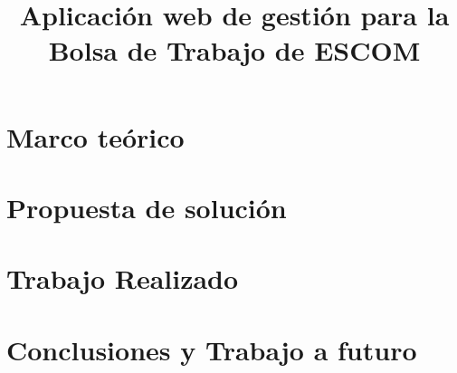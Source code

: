 \documentclass[11pt, twopages]{book}
\date{}
\title{Aplicación web de gestión para la Bolsa de Trabajo de ESCOM}
\author{}
\begin{document}
    \frontmatter
        \maketitle
        \tableofcontents
        \listoffigures
        \listoftables
    \mainmatter
    

    \label{aloneparts:intro}

    \chapter{Marco teórico}
    \label{aloneparts:marcoteorico}
     
    
    \chapter{Propuesta de solución}
    \label{aloneparts:solucionp}
     

    \chapter{Trabajo Realizado}
    \label{trabajorealizado}
      
      
    

    \chapter{Conclusiones y Trabajo a futuro}
    \label{conclusiones}
    
        
    \appendix

      
      
      
      
      
      

    \medskip

    \printbibliography
        \printbibliography
\end{document}
